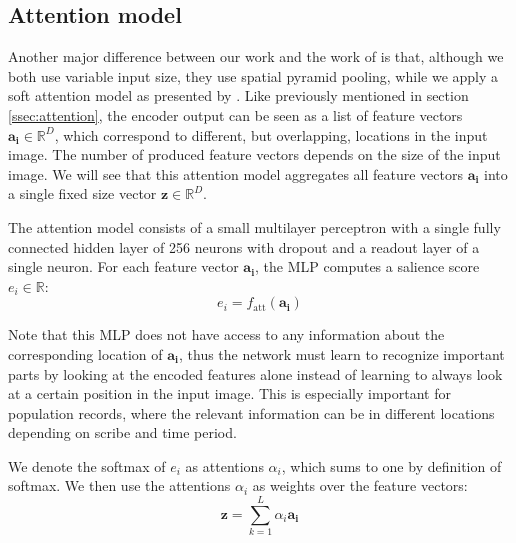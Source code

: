 


\subsection{Attention model}

Another major difference between our work and the work of \textcite{FornesCnnCategorization} is that, although we both use variable input size, they use spatial pyramid pooling, while we apply a soft attention model as presented by \textcite{machine_translation_attention}.
Like previously mentioned in section \ref{ssec:attention}, the encoder output can be seen as a list of feature vectors $\mathbf{a_i} \in \mathbb{R}^D$, which correspond to different, but overlapping, locations in the input image. The number of produced feature vectors depends on the size of the input image. We will see that this attention model aggregates all feature vectors $\mathbf{a_i}$ into a single fixed size vector $\mathbf{z} \in \mathbb{R}^D$.

The attention model consists of a small multilayer perceptron with a single fully connected hidden layer of 256 neurons with dropout and a readout layer of a single neuron.
For each feature vector $\mathbf{a_i}$, the MLP computes a salience score $e_i \in \mathbb{R}$:
\[
e_i = f_\text{att}(\mathbf{a_i})
\]

Note that this MLP does not have access to any information about the corresponding location of $\mathbf{a_i}$, thus the network must learn to recognize important parts by looking at the encoded features alone instead of learning to always look at a certain position in the input image. This is especially important for population records, where the relevant information can be in different locations depending on scribe and time period.


We denote the softmax of $e_i$ as attentions $\alpha_i$, which sums to one by definition of softmax.
We then use the attentions $\alpha_i$ as weights over the feature vectors:
\[
\mathbf{z} = \sum_{k=1}^L \alpha_i \mathbf{a_i}
\]

